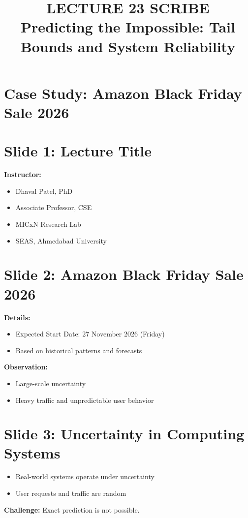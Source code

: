 \documentclass[12pt]{article}
\title{\textbf{LECTURE 23 SCRIBE}\\
Predicting the Impossible: Tail Bounds and System Reliability}
\author{}
\date{}
\begin{document}
\maketitle

\section*{Case Study: Amazon Black Friday Sale 2026}

\section*{Slide 1: Lecture Title}
\textbf{Instructor:}
\begin{itemize}
    \item Dhaval Patel, PhD
    \item Associate Professor, CSE
    \item MICxN Research Lab
    \item SEAS, Ahmedabad University
\end{itemize}

\section*{Slide 2: Amazon Black Friday Sale 2026}
\textbf{Details:}
\begin{itemize}
    \item Expected Start Date: 27 November 2026 (Friday)
    \item Based on historical patterns and forecasts
\end{itemize}

\textbf{Observation:}
\begin{itemize}
    \item Large-scale uncertainty
    \item Heavy traffic and unpredictable user behavior
\end{itemize}

\section*{Slide 3: Uncertainty in Computing Systems}
\begin{itemize}
    \item Real-world systems operate under uncertainty
    \item User requests and traffic are random
\end{itemize}

\textbf{Challenge:} Exact prediction is not possible.
\end{document}
